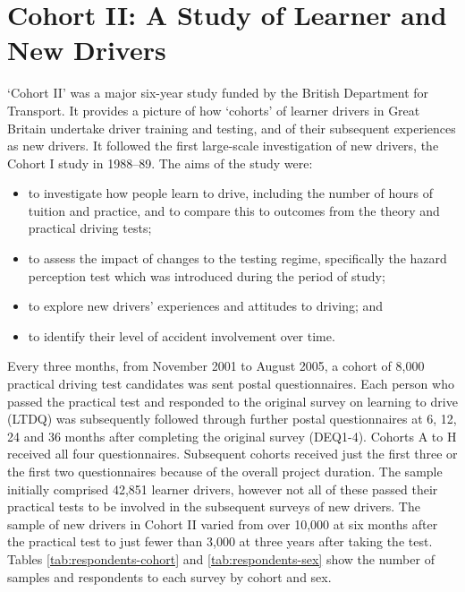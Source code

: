 \documentclass[runningheads]{llncs}
\begin{document}
\section{Cohort II: A Study of Learner and New Drivers}\label{sec:cohortii}
`Cohort II' was a major six-year study funded by the British Department for Transport. It provides a picture of how `cohorts’ of learner drivers in Great Britain undertake driver training and testing, and of their subsequent experiences as new drivers. It followed the first large-scale investigation of new drivers, the Cohort I study in 1988–89. The aims of the study were:
\begin{itemize}[topsep=0pt]
    \item to investigate how people learn to drive, including the number of hours of tuition and practice, and to compare this to outcomes from the theory and practical driving tests;
    \item to assess the impact of changes to the testing regime, specifically the hazard perception test which was introduced during the period of study;
    \item to explore new drivers’ experiences and attitudes to driving; and
    \item to identify their level of accident involvement over time.
\end{itemize}
Every three months, from November 2001 to August 2005, a cohort of 8,000 practical driving test candidates was sent postal questionnaires. Each person who passed the practical test and responded to the original survey on learning to drive (LTDQ) was subsequently followed through further postal questionnaires at 6, 12, 24 and 36 months after completing the original survey (DEQ1-4). Cohorts A to H received all four questionnaires. Subsequent cohorts received just the first three or the first two questionnaires because of the overall project duration.
The sample initially comprised 42,851 learner drivers, however not all of these passed their practical tests to be involved in the subsequent surveys of new drivers. The sample of new drivers in Cohort II varied from over 10,000 at six months after the practical test to just fewer than 3,000 at three years after taking the test. Tables \ref{tab:respondents-cohort} and \ref{tab:respondents-sex} show the number of samples and respondents to each survey by cohort and sex. 
\vspace{2ex}
\end{document}
